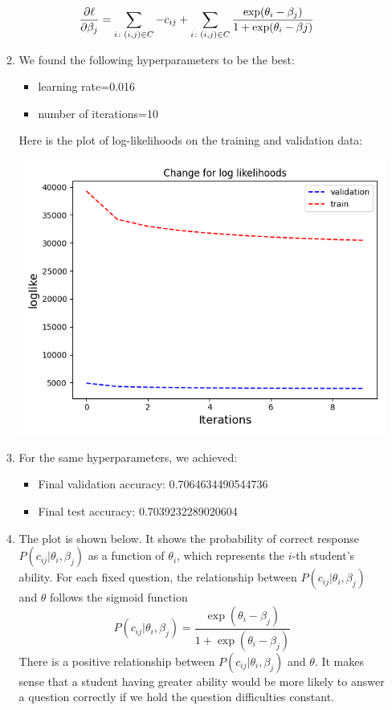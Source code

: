 \documentclass{article}
\begin{document}
\begin{enumerate}[label=\arabic*.]
\begin{enumerate}[label=(\alph*)]
\begin{align*}
                    \pdv{\ell}{\beta_j} &= \sum_{i\colon (i, j)\in C}{-c_{ij}} + \sum_{i\colon (i, j)\in C}{\frac{\exp(\theta_i-\beta_j)}{1+\exp(\theta_i-\beta j)}}
                \end{align*}
            \item We found the following hyperparameters to be the best:
                \begin{itemize}
                    \item learning rate=0.016
                    \item number of iterations=10 
                \end{itemize}
                Here is the plot of log-likelihoods on the training and validation data:
                \begin{center}
                    \includegraphics[width=0.6\linewidth]{../starter_code/irt_output/myplot.png}
                \end{center}
            \item For the same hyperparameters, we achieved:
                \begin{itemize}
                    \item Final validation accuracy: 0.7064634490544736
                    \item Final test accuracy: 0.7039232289020604
                \end{itemize}
            \item The plot is shown below. It shows the probability of correct response $P(c_{ij}|\theta_i,\beta_j)$ as a function of $\theta_i$, which represents the $i$-th student's ability. For each fixed question, the relationship between $P(c_{ij}|\theta_i,\beta_j)$ and $\theta$ follows the sigmoid function \[
                    P(c_{ij}|\theta_i,\beta_j)=\frac{\exp(\theta_i-\beta_j)}{1+\exp(\theta_i-\beta_j)}
            \] 
            There is a positive relationship between $P(c_{ij}|\theta_i,\beta_j)$ and $\theta$. It makes sense that a student having greater ability would be more likely to answer a question correctly if we hold the question difficulties constant.


\end{enumerate}
\end{enumerate}
\end{document}
